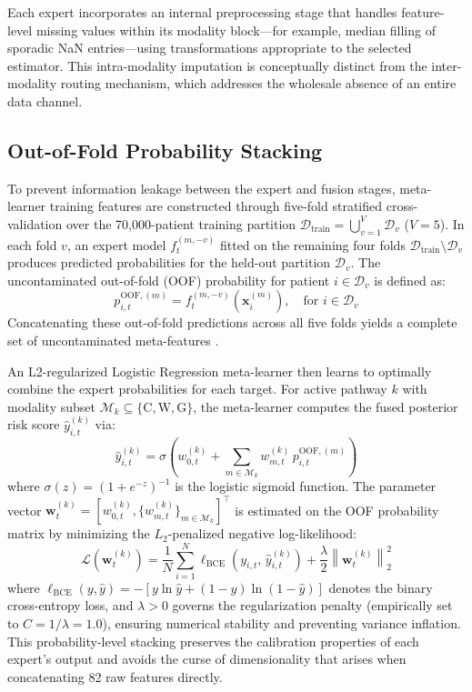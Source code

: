 \documentclass[10pt,twocolumn,letterpaper]{article}
\begin{document}
Each expert incorporates an internal preprocessing stage that handles feature-level missing values within its modality block---for example, median filling of sporadic NaN entries---using transformations appropriate to the selected estimator. This intra-modality imputation is conceptually distinct from the inter-modality routing mechanism, which addresses the wholesale absence of an entire data channel.

\subsection{Out-of-Fold Probability Stacking}
To prevent information leakage between the expert and fusion stages, meta-learner training features are constructed through five-fold stratified cross-validation over the 70{,}000-patient training partition $\mathcal{D}_{\text{train}} = \bigcup_{v=1}^{V} \mathcal{D}_v$ ($V=5$). In each fold $v$, an expert model $f_t^{(m,-v)}$ fitted on the remaining four folds $\mathcal{D}_{\text{train}} \setminus \mathcal{D}_v$ produces predicted probabilities for the held-out partition $\mathcal{D}_v$. The uncontaminated out-of-fold (OOF) probability for patient $i \in \mathcal{D}_v$ is defined as:
\begin{equation}
\label{eq:oof}
p_{i,t}^{\text{OOF},(m)} = f_t^{(m,-v)}\left(\mathbf{x}_i^{(m)}\right), \quad \text{for } i \in \mathcal{D}_v
\end{equation}
Concatenating these out-of-fold predictions across all five folds yields a complete set of uncontaminated meta-features \citep{wolpert1992stacked}.

An L2-regularized Logistic Regression meta-learner then learns to optimally combine the expert probabilities for each target. For active pathway $k$ with modality subset $\mathcal{M}_k \subseteq \{\text{C}, \text{W}, \text{G}\}$, the meta-learner computes the fused posterior risk score $\hat{y}_{i,t}^{(k)}$ via:
\begin{equation}
\label{eq:stacking}
\hat{y}_{i,t}^{(k)} = \sigma \left( w_{0,t}^{(k)} + \sum_{m \in \mathcal{M}_k} w_{m,t}^{(k)} \, p_{i,t}^{\text{OOF},(m)} \right)
\end{equation}
where $\sigma(z) = (1 + e^{-z})^{-1}$ is the logistic sigmoid function. The parameter vector $\mathbf{w}_t^{(k)} = [w_{0,t}^{(k)}, \{w_{m,t}^{(k)}\}_{m \in \mathcal{M}_k}]^\top$ is estimated on the OOF probability matrix by minimizing the $L_2$-penalized negative log-likelihood:
\begin{equation}
\label{eq:loss}
\mathcal{L}\left(\mathbf{w}_t^{(k)}\right) = \frac{1}{N} \sum_{i=1}^{N} \ell_{\text{BCE}}\left(y_{i,t}, \, \hat{y}_{i,t}^{(k)}\right) + \frac{\lambda}{2} \left\|\mathbf{w}_t^{(k)}\right\|_2^2
\end{equation}
where $\ell_{\text{BCE}}(y, \hat{y}) = -\left[ y \ln \hat{y} + (1 - y) \ln (1 - \hat{y}) \right]$ denotes the binary cross-entropy loss, and $\lambda > 0$ governs the regularization penalty (empirically set to $C = 1/\lambda = 1.0$), ensuring numerical stability and preventing variance inflation. This probability-level stacking preserves the calibration properties of each expert's output and avoids the curse of dimensionality that arises when concatenating 82 raw features directly.
\end{document}
